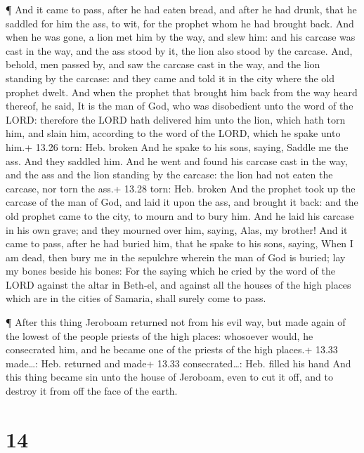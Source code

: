  ¶ And it came to pass, after he had eaten bread, and after
he had drunk, that he saddled for him the ass, to wit, for the prophet
whom he had brought back.  And when he was gone, a lion met
him by the way, and slew him: and his carcase was cast in the way, and
the ass stood by it, the lion also stood by the carcase. 
And, behold, men passed by, and saw the carcase cast in the way, and the
lion standing by the carcase: and they came and told it in the city
where the old prophet dwelt.  And when the prophet that
brought him back from the way heard thereof, he said, It is the man of
God, who was disobedient unto the word of the LORD: therefore the LORD
hath delivered him unto the lion, which hath torn him, and slain him,
according to the word of the LORD, which he spake unto him.+ 13.26 torn:
Heb. broken  And he spake to his sons, saying, Saddle me
the ass. And they saddled him.  And he went and found his
carcase cast in the way, and the ass and the lion standing by the
carcase: the lion had not eaten the carcase, nor torn the ass.+ 13.28
torn: Heb. broken  And the prophet took up the carcase of
the man of God, and laid it upon the ass, and brought it back: and the
old prophet came to the city, to mourn and to bury him. 
And he laid his carcase in his own grave; and they mourned over him,
saying, Alas, my brother!  And it came to pass, after he
had buried him, that he spake to his sons, saying, When I am dead, then
bury me in the sepulchre wherein the man of God is buried; lay my bones
beside his bones:  For the saying which he cried by the
word of the LORD against the altar in Beth-el, and against all the
houses of the high places which are in the cities of Samaria, shall
surely come to pass.

 ¶ After this thing Jeroboam returned not from his evil
way, but made again of the lowest of the people priests of the high
places: whosoever would, he consecrated him, and he became one of the
priests of the high places.+ 13.33 made\ldots: Heb. returned and made+
13.33 consecrated\ldots: Heb. filled his hand  And this
thing became sin unto the house of Jeroboam, even to cut it off, and to
destroy it from off the face of the earth.

\hypertarget{section-13}{%
\section{14}\label{section-13}}

